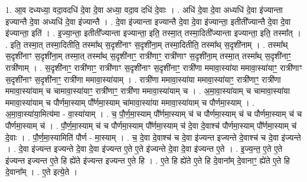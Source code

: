 \documentclass[17pt]{extarticle}
\begin{document}
1. आ॒व दध्यध्या॒ वदा॒वदधि॑ दे॒वा दे॒वा अध्या॒ वदा॒व दधि॑ दे॒वाः । . अधि॑ दे॒वा दे॒वा अध्यधि॑ दे॒वा इ॑ज्यान्ता इज्यान्तै दे॒वा अध्यधि॑ दे॒वा इ॑ज्यान्तै । . दे॒वा इ॑ज्यान्ता इज्यान्तै दे॒वा दे॒वा इ॑ज्यान्ता॒ इतीती᳚ज्यान्तै दे॒वा दे॒वा इ॑ज्यान्ता॒ इति॑ । . इ॒ज्या॒न्ता॒ इतीती᳚ज्यान्ता इज्यान्ता॒ इति॒ तस्मा॒त् तस्मा॒दिती᳚ज्यान्ता इज्यान्ता॒ इति॒ तस्मा᳚त् । . इति॒ तस्मा॒त् तस्मा॒दितीति॒ तस्मा᳚थ् स॒दृशी॑नाꣳ स॒दृशी॑ना॒म् तस्मा॒दितीति॒ तस्मा᳚थ् स॒दृशी॑नाम् । . तस्मा᳚थ् स॒दृशी॑नाꣳ स॒दृशी॑ना॒म् तस्मा॒त् तस्मा᳚थ् स॒दृशी॑नाꣳ॒॒ रात्री॑णाꣳ॒॒ रात्री॑णाꣳ स॒दृशी॑ना॒म् तस्मा॒त् तस्मा᳚थ् स॒दृशी॑नाꣳ॒॒ रात्री॑णाम् । . स॒दृशी॑नाꣳ॒॒ रात्री॑णाꣳ॒॒ रात्री॑णाꣳ स॒दृशी॑नाꣳ स॒दृशी॑नाꣳ॒॒ रात्री॑णा ममावा॒स्या॑या ममावा॒स्या॑याꣳ॒॒ रात्री॑णाꣳ स॒दृशी॑नाꣳ स॒दृशी॑नाꣳ॒॒ रात्री॑णा ममावा॒स्या॑याम् । . रात्री॑णा ममावा॒स्या॑या ममावा॒स्या॑याꣳ॒॒ रात्री॑णाꣳ॒॒ रात्री॑णा ममावा॒स्या॑याम् च चामावा॒स्या॑याꣳ॒॒ रात्री॑णाꣳ॒॒ रात्री॑णा ममावा॒स्या॑याम् च । . अ॒मा॒वा॒स्या॑याम् च चामावा॒स्या॑या ममावा॒स्या॑याम् च पौर्णमा॒स्याम् पौ᳚र्णमा॒स्याम् चा॑मावा॒स्या॑या ममावा॒स्या॑याम् च पौर्णमा॒स्याम् । . अ॒मा॒वा॒स्या॑या॒मित्य॑मा - वा॒स्या॑याम् । . च॒ पौ॒र्ण॒मा॒स्याम् पौ᳚र्णमा॒स्याम् च॑ च पौर्णमा॒स्याम् च॑ च पौर्णमा॒स्याम् च॑ च पौर्णमा॒स्याम् च॑ । . पौ॒र्ण॒मा॒स्याम् च॑ च पौर्णमा॒स्याम् पौ᳚र्णमा॒स्याम् च॑ दे॒वा दे॒वाश्च॑ पौर्णमा॒स्याम् पौ᳚र्णमा॒स्याम् च॑ दे॒वाः । . पौ॒र्ण॒मा॒स्यामिति॑ पौर्ण - मा॒स्याम् । . च॒ दे॒वा दे॒वाश्च॑ च दे॒वा इ॑ज्यन्त इज्यन्ते दे॒वाश्च॑ च दे॒वा इ॑ज्यन्ते । . दे॒वा इ॑ज्यन्त इज्यन्ते दे॒वा दे॒वा इ॑ज्यन्त ए॒ते ए॒ते इ॑ज्यन्ते दे॒वा दे॒वा इ॑ज्यन्त ए॒ते । . इ॒ज्य॒न्त॒ ए॒ते ए॒ते इ॑ज्यन्त इज्यन्त ए॒ते हि ह्ये॑ते इ॑ज्यन्त इज्यन्त ए॒ते हि । . ए॒ते हि ह्ये॑ते ए॒ते हि दे॒वाना᳚म् दे॒वानाꣳ॒॒ ह्ये॑ते ए॒ते हि दे॒वाना᳚म् । . ए॒ते इत्ये॒ते । \newline
\end{document}
